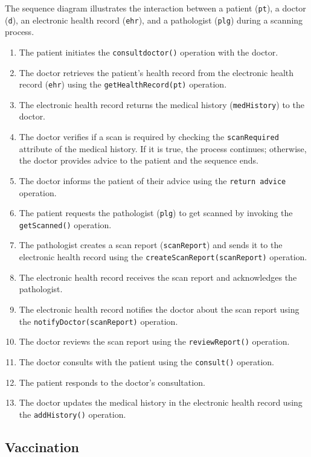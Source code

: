 The sequence diagram illustrates the interaction between a patient (\texttt{pt}), a doctor (\texttt{d}), an electronic health record (\texttt{ehr}), and a pathologist (\texttt{plg}) during a scanning process.

\begin{enumerate}
\item The patient initiates the \texttt{consultdoctor()} operation with the doctor.
\item The doctor retrieves the patient's health record from the electronic health record (\texttt{ehr}) using the \texttt{getHealthRecord(pt)} operation.
\item The electronic health record returns the medical history (\texttt{medHistory}) to the doctor.
\item The doctor verifies if a scan is required by checking the \texttt{scanRequired} attribute of the medical history. If it is true, the process continues; otherwise, the doctor provides advice to the patient and the sequence ends.
\item The doctor informs the patient of their advice using the \texttt{return advice} operation.
\item The patient requests the pathologist (\texttt{plg}) to get scanned by invoking the \texttt{getScanned()} operation.
\item The pathologist creates a scan report (\texttt{scanReport}) and sends it to the electronic health record using the \texttt{createScanReport(scanReport)} operation.
\item The electronic health record receives the scan report and acknowledges the pathologist.
\item The electronic health record notifies the doctor about the scan report using the \texttt{notifyDoctor(scanReport)} operation.
\item The doctor reviews the scan report using the \texttt{reviewReport()} operation.
\item The doctor consults with the patient using the \texttt{consult()} operation.
\item The patient responds to the doctor's consultation.
\item The doctor updates the medical history in the electronic health record using the \texttt{addHistory()} operation.
\end{enumerate}

\subsection{Vaccination}

